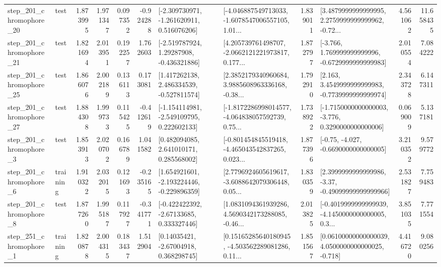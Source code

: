 \begin{tabular}{llrrrrllrlrr}
  step\_201\_chromophore\_20 &      test &      1.873995 &    1.971347 &      0.097352 & -0.924288 &   [-2.309730971, -1.261620911, 0.516076206] &  [-4.046887549713033, -1.6078547006557105, 1.01... &       1.839011 &  [3.4879999999999995, 2.2759999999999962, -0.72... &            4.561062 &         11.658435 \\
  step\_201\_chromophore\_21 &      test &      1.821694 &    2.013951 &      0.192257 &  1.762603 &    [-2.519787924, 1.29287908, -0.436321886] &  [4.205739761498707, -2.0662121221973817, 0.177... &       1.872797 &   [-3.766, 1.769999999999996, -0.6729999999999983] &            2.010554 &          7.084222 \\
  step\_201\_chromophore\_25 &      test &      1.866076 &    2.002189 &      0.136113 &  0.173081 &    [1.417262138, 2.486334539, -0.527811574] &  [2.3852179340960684, 3.9885608963336168, -0.38... &       1.792910 &   [2.163, 3.4549999999999983, -0.7739999999999974] &            2.343728 &          6.147311 \\
  step\_201\_chromophore\_27 &      test &      1.884308 &    1.999733 &      0.115425 & -0.412619 &   [-1.154114981, -2.549109795, 0.222602133] &  [-1.8172286998014577, -4.064838057592739, 0.75... &       1.738922 &  [-1.7150000000000003, -3.776, 0.3290000000000006] &            0.069009 &          5.137181 \\
   step\_201\_chromophore\_3 &      test &      1.853913 &    2.020702 &      0.166789 &  1.041582 &     [0.482094085, 2.641010171, 0.285568002] &  [-0.801454845519418, -4.465043542837265, 0.023... &       1.877396 &               [-0.75, -4.027, -0.6690000000000005] &            3.210352 &          9.579772 \\
   step\_201\_chromophore\_6 &  training &      1.910322 &    2.032015 &      0.121693 & -0.235165 &   [1.654921601, -2.193224446, -0.229896359] &  [2.7796924605619617, -3.6088642079306448, 0.05... &       1.830359 &  [2.3999999999999986, -3.37, -0.49099999999999966] &            2.531827 &          7.759483 \\
   step\_201\_chromophore\_8 &      test &      1.877260 &    1.995187 &      0.117927 & -0.341771 &    [-0.422422392, -2.67133685, 0.333327446] &  [1.0831094361939286, 4.5690342173288085, -0.46... &       2.013825 &  [-0.4019999999999939, -4.1450000000000005, 0.3... &            3.851035 &          7.771554 \\
   step\_251\_chromophore\_1 &  training &      1.820878 &    2.004315 &      0.183437 &  1.512904 &      [0.14035421, -2.67004918, 0.368298745] &  [0.15165285640180945, -4.503562289081286, 0.11... &       1.851567 &  [0.06100000000000039, 4.0500000000000025, -0.718] &            4.416720 &          9.080256 \\

\end{tabular}
